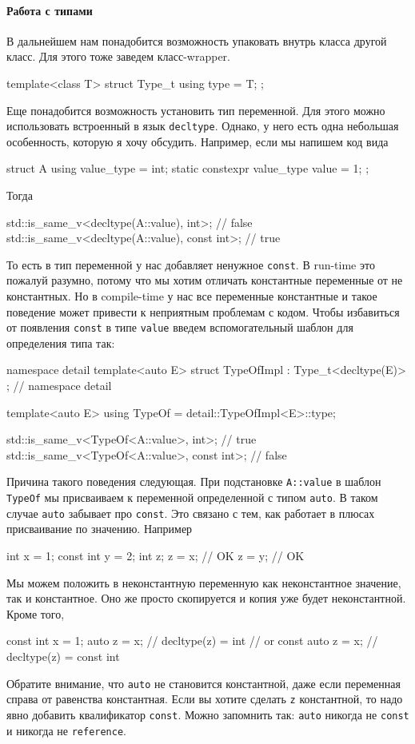 \paragraph{Работа с типами}

В дальнейшем нам понадобится возможность упаковать внутрь класса другой класс.
Для этого тоже заведем класс-wrapper.
\begin{cppcode}
template<class T>
struct Type_t {
  using type = T;
};
\end{cppcode}
Еще понадобится возможность установить тип переменной.
Для этого можно использовать встроенный в язык \verb"decltype".
Однако, у него есть одна небольшая особенность, которую я хочу обсудить.
Например, если мы напишем код вида
\begin{cppcode}
struct A {
  using value_type = int;
  static constexpr value_type value = 1;
};
\end{cppcode}
Тогда
\begin{cppcode}
std::is_same_v<decltype(A::value), int>; // false
std::is_same_v<decltype(A::value), const int>; // true
\end{cppcode}
То есть в тип переменной у нас добавляет ненужное \verb"const".
В run-time это пожалуй разумно, потому что мы хотим отличать константные переменные от не константных.
Но в compile-time у нас все переменные константные и такое поведение может привести к неприятным проблемам с кодом.
Чтобы избавиться от появления \verb"const" в типе \verb"value" введем вспомогательный шаблон для определения типа так:
\begin{cppcode}
namespace detail {
template<auto E>
struct TypeOfImpl : Type_t<decltype(E)> {};
} // namespace detail

template<auto E>
using TypeOf = detail::TypeOfImpl<E>::type;
\end{cppcode}
\begin{cppcode}
std::is_same_v<TypeOf<A::value>, int>; // true
std::is_same_v<TypeOf<A::value>, const int>; // false
\end{cppcode}
Причина такого поведения следующая.
При подстановке \verb"A::value" в шаблон \verb"TypeOf" мы присваиваем к переменной определенной с типом \verb"auto".
В таком случае \verb"auto" забывает про \verb"const".
Это связано с тем, как работает в плюсах присваивание по значению.
Например
\begin{cppcode}
int x = 1;
const int y = 2;
int z;
z = x; // OK
z = y; // OK
\end{cppcode}
Мы можем положить в неконстантную переменную как неконстантное значение, так и константное.
Оно же просто скопируется и копия уже будет неконстантной.
Кроме того,
\begin{cppcode}
const int x = 1;
auto z = x;  // decltype(z) = int
// or
const auto z = x; // decltype(z) = const int
\end{cppcode}
Обратите внимание, что \verb"auto" не становится константной, даже если переменная справа от равенства константная.
Если вы хотите сделать \verb"z" константной, то надо явно добавить квалификатор \verb"const".
Можно запомнить так: \verb"auto" никогда не \verb"const" и никогда не \verb"reference".


